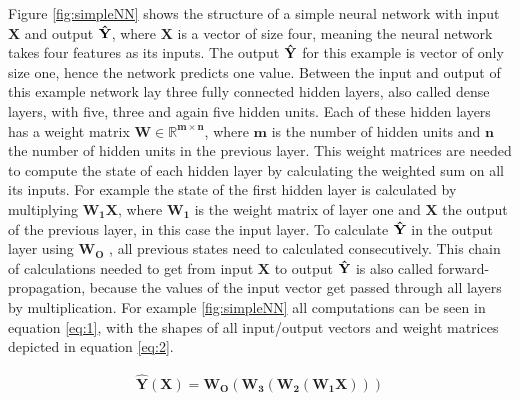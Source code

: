 Figure \ref{fig:simpleNN} shows the structure of a simple neural network with input $\mathbf{X}$ and output $\mathbf{\Hat{Y}}$, where $\mathbf{X}$ is a vector of size four, meaning the neural network takes four features as its inputs. 
The output $\mathbf{\Hat{Y}}$ for this example is vector of only size one, hence the network predicts one value.
Between the input and output of this example network lay three fully connected hidden layers, also called dense layers, with five, three and again five hidden units.
Each of these hidden layers has a weight matrix $\mathbf{W\in\mathbb{R}^{m\times n}}$, where $\mathbf{m}$ is the number of hidden units and $\mathbf{n}$ the number of hidden units in the previous layer.
This weight matrices are needed to compute the state of each hidden layer by calculating the weighted sum on all its inputs.
For example the state of the first hidden layer is calculated by multiplying $\mathbf{W_1X}$, where $\mathbf{W_1}$ is the weight matrix of layer one and $\mathbf{X}$ the output of the previous layer, in this case the input layer.
To calculate  $\mathbf{\Hat{Y}}$ in the output layer using $\mathbf{W_O}$ , all previous states need to calculated consecutively. 
This chain of calculations needed to get from input $\mathbf{X}$ to output $\mathbf{\Hat{Y}}$ is also called forward-propagation, because the values of the input vector get passed through all layers by multiplication.
For example \ref{fig:simpleNN} all computations can be seen in equation \ref{eq:1}, with the shapes of all input/output vectors and weight matrices depicted in equation \ref{eq:2}.

\begin{equation} \label{eq:1}
\begin{gathered}
\mathbf{\hat{Y}(X)} = \mathbf{W_O(W_3(W_2(W_1X)))}
\end{gathered}
\end{equation}


